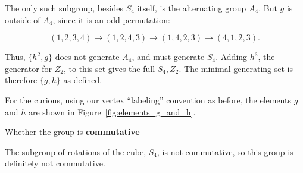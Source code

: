 \documentclass[../key.tex]{subfiles}
\begin{document}
The only such subgroup, besides $S_4$ itself, is the alternating group $A_4$. But $g$ is outside of $A_4$, since it is an odd permutation:

$$(1,2,\boxed{3,4})\to (1,\boxed{2,4},3)\to (\boxed{1,4},2,3) \to (4,1,2,3).$$

Thus, $\{h^2,g\}$ does not generate $A_4$, and must generate $S_4$. Adding $h^3$, the generator for $Z_2$, to this set gives the full $S_4,Z_2$. The minimal generating set is therefore $\{g,h\}$ as defined.

For the curious, using our vertex ``labeling'' convention as before, the elements $g$ and $h$ are shown in Figure~\ref{fig:elements_g_and_h}.

\begin{inner_problem}
\item Whether the group is \textbf{commutative}
\end{inner_problem}

\noindent The subgroup of rotations of the cube, $S_4$, is not commutative, so this group is definitely not commutative.

\pagebreak
\end{document}
